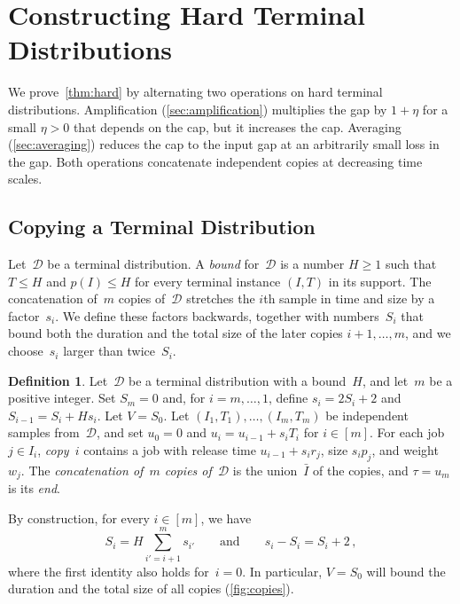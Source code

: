 \documentclass[11pt,letterpaper]{article}
\theoremstyle{definition}
\newtheorem{definition}[theorem]{Definition}
\theoremstyle{remark}
\newcommand{\cD}{\mathcal{D}}
\begin{document}
\section{Constructing Hard Terminal Distributions}\label{sec:construction}

We prove~\cref{thm:hard} by alternating two operations on hard terminal distributions. Amplification (\cref{sec:amplification}) multiplies the gap by $1+\eta$ for a small $\eta>0$ that depends on the cap, but it increases the cap. Averaging (\cref{sec:averaging}) reduces the cap to the input gap at an arbitrarily small loss in the gap. Both operations concatenate independent copies at decreasing time scales.

\subsection{Copying a Terminal Distribution}\label{sec:copies}



Let~$\cD$ be a terminal distribution. A \emph{bound} for~$\cD$ is a number $H\ge1$ such that $T\le H$ and $p(I)\le H$ for every terminal instance $(I,T)$ in its support. The concatenation of~$m$ copies of~$\cD$ stretches the $i$th sample in time and size by a factor~$s_i$. We define these factors backwards, together with numbers~$S_i$ that bound both the duration and the total size of the later copies $i+1,\dots,m$, and we choose~$s_i$ larger than twice~$S_i$.

\begin{definition}\label{def:concatenation}
Let~$\cD$ be a terminal distribution with a bound~$H$, and let~$m$ be a positive integer. Set $S_m=0$ and, for $i=m,\dots,1$, define $s_i=2S_i+2$ and $S_{i-1}=S_i+Hs_i$. Let $V=S_0$. Let $(I_1,T_1),\dots,(I_m,T_m)$ be independent samples from~$\cD$, and set $u_0=0$ and $u_i=u_{i-1}+s_iT_i$ for $i\in[m]$. For each job $j\in I_i$, \emph{copy~$i$} contains a job with release time $u_{i-1}+s_ir_j$, size $s_ip_j$, and weight~$w_j$. The \emph{concatenation of~$m$ copies of~$\cD$} is the union~$\bar I$ of the copies, and $\tau=u_m$ is its \emph{end}.
\end{definition}

By construction, for every $i\in[m]$, we have
\begin{equation}\label{eq:scales}
  S_i=H\sum_{i'=i+1}^m s_{i'}
  \qquad\text{and}\qquad
  s_i-S_i=S_i+2\,,
\end{equation}
where the first identity also holds for~$i=0$. In particular, $V=S_0$ will bound the duration and the total size of all copies (\cref{fig:copies}).
\end{document}
